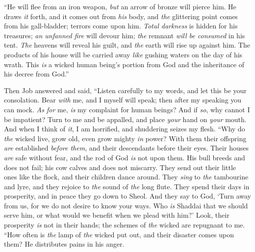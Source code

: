 \begin{biblechapter}
\verse “He will flee from an iron weapon, 
\textit{but} an arrow of bronze will pierce him.
\verse He draws \textit{it} forth, and it comes out from \textit{his} body, 
and \textit{the} glittering point comes from his gall-bladder; 
terrors come upon him.
\verse \textit{Total darkness} is hidden for his treasures; 
\textit{an unfanned fire} will devour him; 
\textit{the} remnant \textit{will be consumed} in his tent.
\verse \textit{The} heavens will reveal his guilt, 
and \textit{the} earth will rise up against him.
\verse The products of his house will be carried away 
\textit{like} gushing waters on the day of his wrath.
\verse This \textit{is} a wicked human being’s portion from God 
and the inheritance of his decree from God.”
\end{biblechapter}

\begin{biblechapter} %
 Then Job answered and said,
\verse “Listen carefully to my words, 
and let this be your consolation.
\verse Bear \textit{with} me, and I myself will speak; 
then after my speaking you can mock.
\verse \textit{As for} me, \textit{is} my complaint for human beings? 
And if \textit{so}, why cannot I be impatient?
\verse Turn to me and be appalled, 
and place \textit{your} hand on \textit{your} mouth.
\verse And when I think of \textit{it}, I am horrified, 
and shuddering seizes my flesh.
\verse “Why do \textit{the} wicked live, 
grow old, even grow mighty \textit{in} power?
\verse With them their offspring \textit{are} established \textit{before them}, 
and their descendants before their eyes.
\verse Their houses \textit{are} safe without fear, 
and the rod of God \textit{is} not upon them.
\verse His bull breeds and does not fail; 
his cow calves and does not miscarry.
\verse They send out their little ones like the flock, 
and their children dance around.
\verse They \textit{sing} to \textit{the} tambourine and lyre, 
and they rejoice to \textit{the} sound of \textit{the} long flute.
\verse They spend their days in prosperity, 
and in peace they go down to Sheol.
\verse And they say to God, ‘Turn away from us, 
for we do not desire to know your ways.
\verse Who \textit{is} Shaddai that we should serve him, 
or what would we benefit when we plead with him?’
\verse Look, their prosperity \textit{is} not in their hands; 
the schemes of \textit{the} wicked are repugnant to me.
\verse “How often is \textit{the} lamp of \textit{the} wicked put out, 
and their disaster comes upon them? 
He distributes pains in his anger.

\end{biblechapter}
